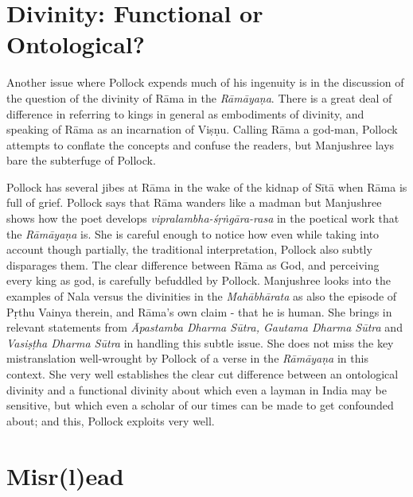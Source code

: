 \section*{Divinity: Functional or Ontological?}

Another issue where Pollock expends much of his ingenuity is in the discussion of the question of the divinity of Rāma in the {\sl Rāmāyaṇa}. There is a great deal of difference in referring to kings in general as embodiments of divinity, and speaking of Rāma as an incarnation of Viṣṇu. Calling Rāma a god-man, Pollock attempts to conflate the concepts and confuse the readers, but Manjushree lays bare the subterfuge of Pollock.

Pollock has several jibes at Rāma in the wake of the kidnap of Sītā when Rāma is full of grief. Pollock says that Rāma wanders like a madman but Manjushree shows how the poet develops {\sl vipralambha-śṛṅgāra-rasa} in the poetical work that the {\sl Rāmāyaṇa} is. She is careful enough to notice how even while taking into account though partially, the traditional interpretation, Pollock also subtly disparages them. The clear difference between Rāma as God, and perceiving every king as god, is carefully befuddled by Pollock. Manjushree looks into the examples of Nala versus the divinities in the {\sl Mahābhārata} as also the episode of Pṛthu Vainya therein, and Rāma's own claim - that he is human. She brings in relevant statements from {\sl Āpastamba Dharma Sūtra, Gautama Dharma Sūtra} and {\sl Vasiṣṭha Dharma Sūtra} in handling this subtle issue. She does not miss the key mistranslation well-wrought by Pollock of a verse in the {\sl Rāmāyaṇa} in this context. She very well establishes the clear cut difference between an ontological divinity and a functional divinity about which even a layman in India may be sensitive, but which even a scholar of our times can be made to get confounded about; and this, Pollock exploits very well.

\section*{Misr(l)ead}

